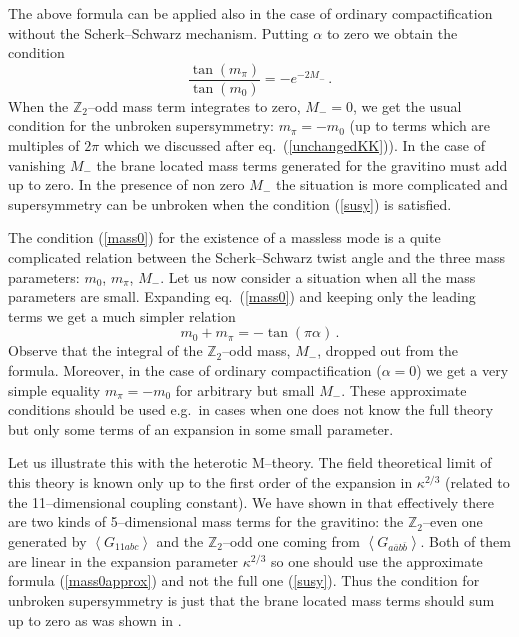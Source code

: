 \documentclass[a4paper,12pt]{article}
\def\ka{\kappa}
\def\al{\alpha}
\def\ZZ{\mathbb Z}
\begin{document}
The above formula can be applied also in the case of ordinary
compactification without the Scherk--Schwarz mechanism. Putting $\al$
to zero we obtain the condition
\begin{equation}
\frac{\tan(m_\pi)}{\tan(m_0)}=-e^{-2M_-}
\,.
\label{susy}
\end{equation}
When the $\ZZ_2$--odd mass term integrates to zero, $M_-=0$, we get
the usual condition for the unbroken supersymmetry: $m_\pi=-m_0$ (up
to terms which are multiples of $2\pi$ which we discussed after eq.\
(\ref{unchangedKK})). In the case of vanishing $M_-$ the brane located
mass terms generated for the gravitino must add up to zero. In the
presence of non zero $M_-$ the situation is more complicated and
supersymmetry can be unbroken when the condition (\ref{susy}) is
satisfied. 


The condition (\ref{mass0}) for the existence of a massless mode is a
quite complicated relation between the Scherk--Schwarz twist angle
and the three mass parameters: $m_0$, $m_\pi$, $M_-$. Let us now
consider a situation when all the mass parameters are small. Expanding
eq.\ (\ref{mass0}) and keeping only the leading terms we get a much
simpler relation 
\begin{equation}
m_0+m_\pi=-\tan(\pi\al)
\,.
\label{mass0approx}
\end{equation}
Observe that the integral of the $\ZZ_2$--odd mass, $M_-$, dropped out
from the formula. Moreover, in the case of ordinary compactification
($\al=0$) we get a very simple equality $m_\pi=-m_0$ for arbitrary but
small $M_-$. These approximate conditions should be used e.g.\ in
cases when one does not know the full theory but only some terms of an
expansion in some small parameter.


Let us illustrate this with the heterotic M--theory. The field
theoretical limit of this theory is known only up to the first order
of the expansion in $\ka^{2/3}$ (related to the 11--dimensional
coupling constant). We have shown in \cite{Meissner:1999ja} that
effectively there are two kinds of 5--dimensional mass terms for the 
gravitino: the $\ZZ_2$--even one generated by $\left<G_{11abc}\right>$
and the $\ZZ_2$--odd one coming from 
$\left<G_{a\bar ab\bar b}\right>$. Both of them are linear in the
expansion parameter $\ka^{2/3}$ so one should use the approximate
formula (\ref{mass0approx}) and not the full one (\ref{susy}).
Thus the condition for unbroken supersymmetry is just that the brane
located mass terms should sum up to zero as was shown in
\cite{Meissner:1999ja}. 
\end{document}
